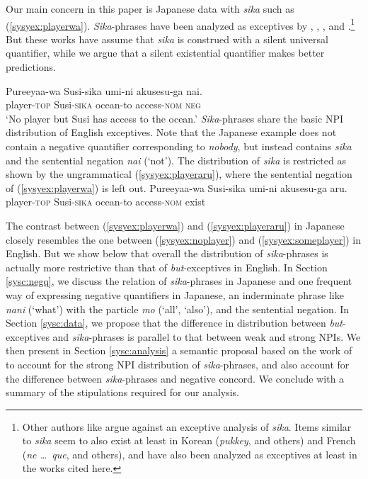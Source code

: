 \documentclass[output=paper,colorlinks,citecolor=brown,
]{langscibook}
\def\refp#1{(\ref{sy#1})}
\def\M#1{\textsc{#1}}
\begin{document}
Our main concern in this paper is Japanese data with \emph{sika} such as \refp{syex:playerwa}.
\emph{Sika}-phrases have been analyzed as exceptives by \cite{alonso-ovalle04a}, \cite{yoshimura2007b}, \cite{kawahara08a}, and \cite{shimoyama11}.\footnote{Other authors like \cite{hasegawa11a} argue against an exceptive analysis of \emph{sika}. Items similar to \emph{sika} seem to also exist at least in Korean (\emph{pukkey}, \citealt{sells01a} and others) and French (\emph{ne \dots\ que}, \citealt{fintel07a} and others), and have also been analyzed as exceptives at least in the works cited here.}  But these works have assume that \emph{sika} is construed with a silent universal quantifier, while we argue that a silent existential quantifier makes better predictions.

\ea \label{syex:playerwa}
\gll Pureeyaa-wa Susi-sika umi-ni akusesu-ga nai.\\
player-\M{top} Susi-\M{sika} ocean-to access-\M{nom} \M{neg}\\
\glt `No player but Susi has access to the ocean.'\z
%
\emph{Sika}-phrases share the basic NPI distribution of English exceptives.
Note that the Japanese example does not contain a negative quantifier corresponding to \emph{nobody}, but instead contains \emph{sika} and the sentential negation \emph{nai} (`not').  The distribution of \emph{sika} is restricted as shown by the ungrammatical \refp{syex:playeraru}, where the sentential negation of \refp{syex:playerwa} is left out.
\ea \label{syex:playeraru}
\gll *Pureeyaa-wa Susi-sika umi-ni akusesu-ga aru.\\
player-\M{top} Susi-\M{sika} ocean-to access-\M{nom} exist\\\z


The contrast between \refp{syex:playerwa} and \refp{syex:playeraru} in Japanese closely resembles the one between \refp{syex:noplayer} and \refp{syex:someplayer} in English.
But we show below that overall the distribution of \emph{sika}-phrases is actually more restrictive than that of \emph{but}-exceptives in English. In Section \ref{sysc:negq}, we discuss the relation of \emph{sika}-phrases in Japanese and one frequent way of expressing negative quantifiers in Japanese, an inderminate phrase like \emph{nani} (`what') with the particle \emph{mo} (`all', `also'), and the sentential negation.
In Section \ref{sysc:data}, we propose that the difference in distribution between \emph{but}-exceptives and \emph{sika}-phrases is parallel to that between weak and strong NPIs.
We then present in Section \ref{sysc:analysis} a semantic proposal based on the work of \cite{gajewski11a} to account for the strong NPI distribution of \emph{sika}-phrases, and also account for the difference between \emph{sika}-phrases and negative concord.  We conclude with a summary of the stipulations required for our analysis.
\end{document}
